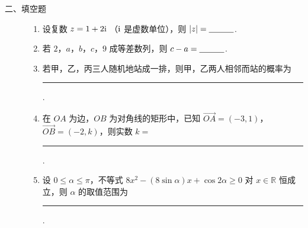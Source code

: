 \begin{description}

    \item[二、填空题]

    \begin{enumerate}[leftmargin=5pt]

      \addtocounter{enumi}{+10}

        \item 设复数 \(z = 1 + 2\mathrm{i}\) （\(\mathrm{i}\) 是虚数单位），则 \(|z| =\rule[-0.3ex]{3em}{0.4pt}\).

        \item 若 \(2\)，\(a\)，\(b\)，\(c\)，\(9\) 成等差数列，则 \(c - a =\rule[-0.3ex]{3em}{0.4pt}\).

        \item 若甲，乙，丙三人随机地站成一排，则甲，乙两人相邻而站的概率为\rule[-0.3ex]{3em}{0.4pt}.

        \item 在 \(OA\) 为边，\(OB\) 为对角线的矩形中，已知 \(\overrightarrow{OA} = (-3, 1)\)，\(\overrightarrow{OB} = (-2, k)\)，则实数 \(k = \)\rule[-0.3ex]{3em}{0.4pt}.

        \item 设 \(0 \leqslant \alpha \leqslant \pi\)，不等式 \(8x^{2} - (8\sin \alpha)x + \cos 2\alpha \geqslant 0\) 对 \(x \in \mathbb{R}\) 恒成立，则 \(\alpha\) 的取值范围为\rule[-0.3ex]{3em}{0.4pt}.

    \end{enumerate}

\end{description}

